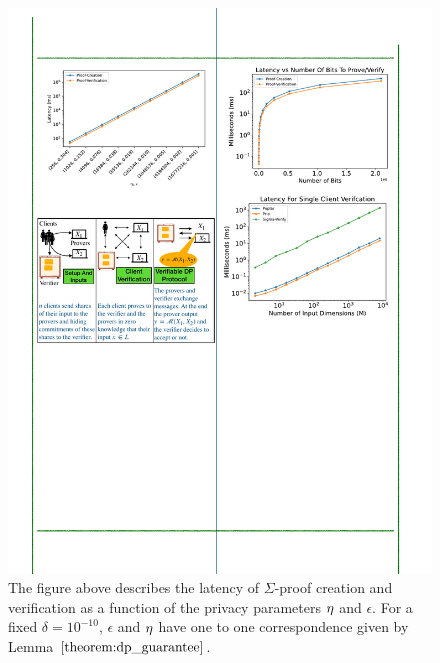  \begin{figure}[t]
     \centering    
     \includegraphics[scale=0.85]{pngs/eps_vs_coins.pdf}
     \caption{The figure above describes the latency of $\Sigma$-proof creation and verification as a function of the privacy parameters $\eta$ and $\epsilon$. For a fixed $\delta=10^{-10}$, $\epsilon$ and $\eta$ have one to one correspondence given by Lemma $\ref{theorem:dp_guarantee}$.}
     \label{fig:esp_vs_coins}
 \end{figure}


